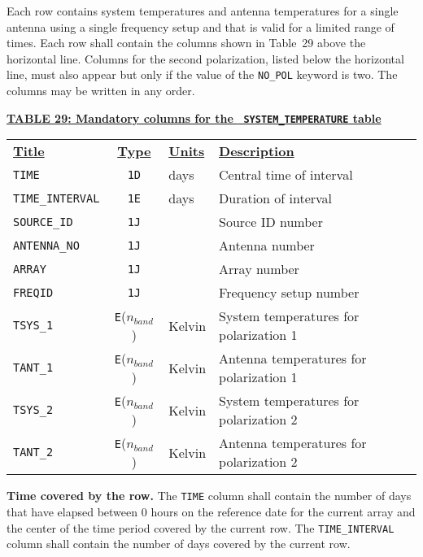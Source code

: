 \documentclass[twoside]{article}
\newcommand{\Hi}[1]{\textcolor{hicol}{#1}}
\newcommand{\nband}{$n_{band}$}
\begin{document}
Each row contains system temperatures and antenna temperatures for a
single antenna using a single frequency setup and that is valid for a
limited range of times.  Each row shall contain the columns shown in
Table~\Hi{29} \Hi{above the horizontal line.  Columns for the second
polarization, listed below the horizontal line, must also appear but
only if the value of the {\tt NO\_POL} keyword is two.}  The columns
may be written in any order.

\begin{center}
\underline{\bf{TABLE \Hi{29}: Mandatory columns for the {\tt
      SYSTEM\_TEMPERATURE} table}}\\
\begin{tabular}{lcll}
\noalign{\vspace{2pt}}
\underline{{\bf Title\vphantom{y}}} & \underline{\bf{Type}} &
   \underline{{\bf Units\vphantom{y}}} & \underline{\bf{Description}} \\
\noalign{\vspace{2pt}}
{\tt TIME}        & {\tt 1D} & days  & Central time of interval \\
{\tt TIME\_INTERVAL} & {\tt 1E} & days & Duration of interval \\
{\tt SOURCE\_ID}  & {\tt 1J} &       & Source ID number \\
{\tt ANTENNA\_NO} & {\tt 1J} &       & Antenna number \\
{\tt ARRAY}       & {\tt 1J} &       & Array number \\
{\tt FREQID}      & {\tt 1J} &       & Frequency setup number \\
{\tt TSYS\_1}     & {\tt E}(\nband) & Kelvin & System temperatures for
                                     polarization 1 \\
{\tt TANT\_1}     & {\tt E}(\nband) & Kelvin & Antenna temperatures for
                                     polarization 1 \\
\hline
{\tt TSYS\_2}     & {\tt E}(\nband) & Kelvin & System temperatures for
                                     polarization 2 \\
{\tt TANT\_2}     & {\tt E}(\nband) & Kelvin & Antenna temperatures for
                                     polarization 2 \\
\end{tabular}
\end{center}

{\bf Time covered by the row.}  The {\tt TIME} column shall contain
the number of days that have elapsed between 0 hours on the reference
date for the current array and the center of the time period covered
by the current row.  The {\tt TIME\_INTERVAL} column shall contain the
number of days covered by the current row.
\end{document}
